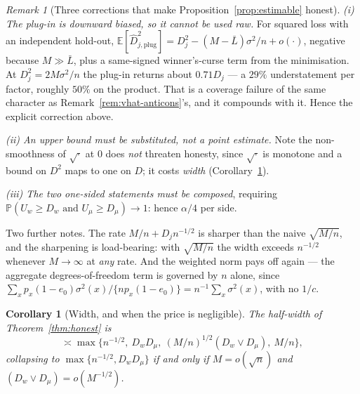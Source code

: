 \documentclass[11pt]{article}
\theoremstyle{plain}
\newtheorem{corollary}{Corollary}
\theoremstyle{definition}
\theoremstyle{remark}
\newtheorem{remark}{Remark}
\newcommand{\E}{\mathbb{E}}
\newcommand{\PP}{\mathbb{P}}
\newcommand{\ez}{e_0}
\newcommand{\Dw}{D_w}
\newcommand{\Dm}{D_\mu}
\begin{document}
\begin{remark}[Three corrections that make Proposition~\ref{prop:estimable} honest]
\label{rem:prop-fixes}
\emph{(i) The plug-in is downward biased, so it cannot be used raw.} For squared
loss with an independent hold-out,
$\E[\widehat D^2_{j,\mathrm{plug}}]=D_j^2-(M-\bar L)\sigma^2/n+o(\cdot)$, negative
because $M\gg\bar L$, plus a same-signed winner's-curse term from the
minimisation. At $D_j^2=2M\sigma^2/n$ the plug-in returns about $0.71D_j$ --- a
$29\%$ understatement per factor, roughly $50\%$ on the product. That is a
coverage failure of the same character as Remark~\ref{rem:vhat-anticons}'s, and it
compounds with it. Hence the explicit correction above.

\emph{(ii) An upper bound must be substituted, not a point estimate.} Note the
non-smoothness of $\sqrt\cdot$ at $0$ does \emph{not} threaten honesty, since
$\sqrt\cdot$ is monotone and a bound on $D^2$ maps to one on $D$; it costs
\emph{width} (Corollary~\ref{cor:width}).

\emph{(iii) The two one-sided statements must be composed}, requiring
$\PP(U_w\ge\Dw\text{ and }U_\mu\ge\Dm)\to1$: hence $\alpha/4$ per side.

Two further notes. The rate $M/n+D_jn^{-1/2}$ is sharper than the naive
$\sqrt{M/n}$, and the sharpening is load-bearing: with $\sqrt{M/n}$ the width
exceeds $n^{-1/2}$ whenever $M\to\infty$ at \emph{any} rate. And the weighted norm
pays off again --- the aggregate degrees-of-freedom term is governed by $n$ alone,
since $\sum_xp_x(1-\ez)\sigma^2(x)/\{np_x(1-\ez)\}=n^{-1}\sum_x\sigma^2(x)$, with
no $1/c$.
\end{remark}

\begin{corollary}[Width, and when the price is negligible]\label{cor:width}
The half-width of Theorem~\ref{thm:honest} is
\[
 \asymp\max\bigl\{n^{-1/2},\ \Dw\Dm,\ (M/n)^{1/2}(\Dw\vee\Dm),\ M/n\bigr\},
\]
collapsing to $\max\{n^{-1/2},\Dw\Dm\}$ if and only if $M=o(\sqrt n)$ and
$(\Dw\vee\Dm)=o(M^{-1/2})$.
\end{corollary}
\end{document}

